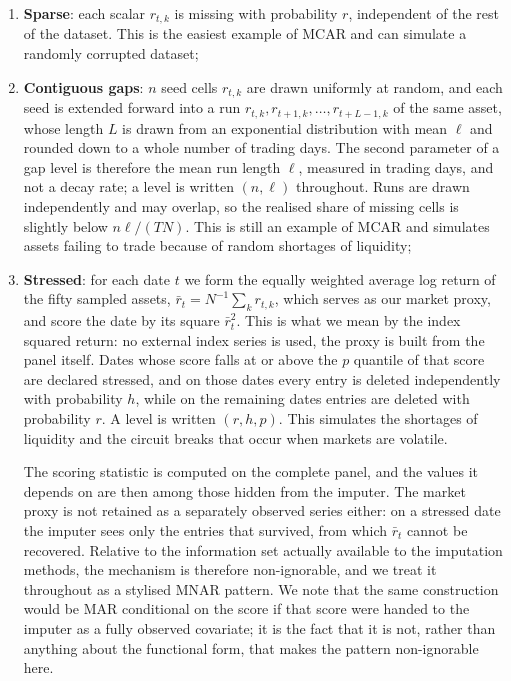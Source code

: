 \begin{enumerate}
    \item \textbf{Sparse}: each scalar $r_{t,k}$ is missing with probability $r$, independent of the rest
    of the dataset. This is the easiest example of MCAR and can simulate a randomly corrupted dataset;
    \item \textbf{Contiguous gaps}: $n$ seed cells $r_{t,k}$ are drawn uniformly at
    random, and each seed is extended forward into a run
    $r_{t,k}, r_{t+1,k}, \dots, r_{t+L-1,k}$ of the same asset, whose length $L$ is
    drawn from an exponential distribution with mean $\ell$ and rounded down to a
    whole number of trading days. The second parameter of a gap level is therefore
    the mean run length $\ell$, measured in trading days, and not a decay rate; a
    level is written $(n, \ell)$ throughout. Runs are drawn independently and may
    overlap, so the realised share of missing cells is slightly below $n\ell/(TN)$.
    This is still an example of MCAR and simulates assets failing to trade because
    of random shortages of liquidity;
    \item \textbf{Stressed}: for each date $t$ we form the equally weighted average
    log return of the fifty sampled assets, $\bar{r}_t = N^{-1}\sum_k r_{t,k}$, which
    serves as our market proxy, and score the date by its square $\bar{r}_t^2$. This
    is what we mean by the index squared return: no external index series is used,
    the proxy is built from the panel itself. Dates whose score falls at or above
    the $p$ quantile of that score are declared stressed, and on those dates every
    entry is deleted independently with probability $h$, while on the remaining
    dates entries are deleted with probability $r$. A level is written $(r, h, p)$.
    This simulates the shortages of liquidity and the circuit breaks that occur when
    markets are volatile.

    The scoring statistic is computed on the complete panel, and the values it
    depends on are then among those hidden from the imputer. The market proxy is
    not retained as a separately observed series either: on a stressed date the
    imputer sees only the entries that survived, from which $\bar{r}_t$ cannot be
    recovered. Relative to the information set actually available to the imputation
    methods, the mechanism is therefore non-ignorable, and we treat it throughout as
    a stylised MNAR pattern. We note that the same construction would be MAR
    conditional on the score if that score were handed to the imputer as a fully
    observed covariate; it is the fact that it is not, rather than anything about
    the functional form, that makes the pattern non-ignorable here.
    
\end{enumerate}


